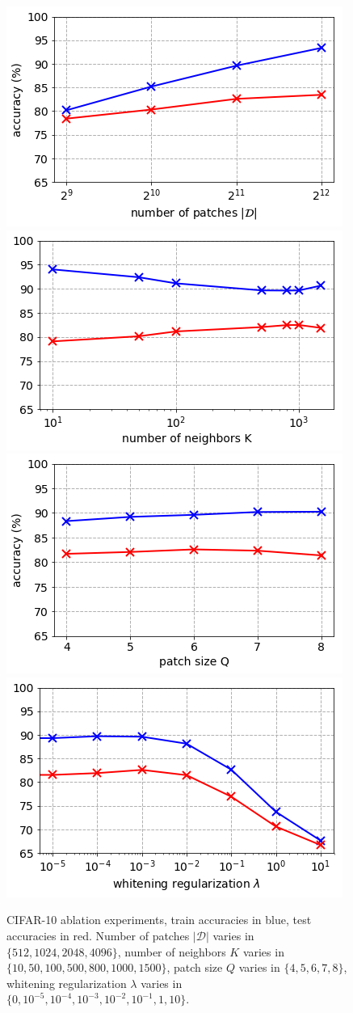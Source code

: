 \documentclass{article} %
\begin{document}
\begin{figure}[h!]
  \centering
   \includegraphics[width=0.49\linewidth]{figures/ablation_npatches_large.png}
  \includegraphics[width=0.49\linewidth]{figures/ablation_K_large.png}
  \includegraphics[width=0.49\linewidth]{figures/ablation_Q_large.png}
  \includegraphics[width=0.49\linewidth]{figures/ablation_lambda_large.png}\\
    \caption{CIFAR-10 ablation experiments, train accuracies in blue, test accuracies in red.
    Number of patches $|\mathcal{D}|$ varies in $\lbrace 512, 1024, 2048, 4096  \rbrace$, number of neighbors $K$ varies in $\lbrace 10, 50, 100, 500, 800, 1000, 1500\rbrace$, patch size $Q$ varies in $\lbrace 4,5,6,7,8 \rbrace$, whitening regularization $\lambda$ varies in $\lbrace0, 10^{-5}, 10^{-4}, 10^{-3}, 10^{-2}, 10^{-1}, 1, 10 \rbrace$. }
    \label{fig:ablation_study_highres}
\end{figure}
\end{document}
